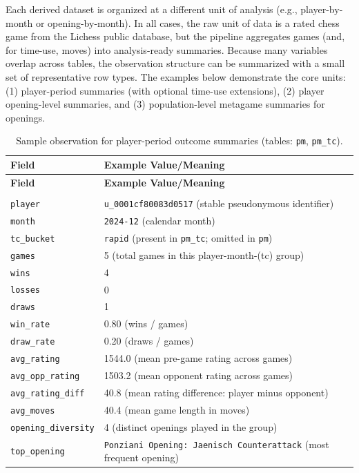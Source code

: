 \documentclass[
  12pt]{article}
\newcommand{\us}{\_\allowbreak}
\begin{document}
Each derived dataset is organized at a different unit of analysis (e.g.,
player-by-month or opening-by-month). In all cases, the raw unit of data
is a rated chess game from the Lichess public database, but the pipeline
aggregates games (and, for time-use, moves) into analysis-ready
summaries. Because many variables overlap across tables, the observation
structure can be summarized with a small set of representative row
types. The examples below demonstrate the core units: (1) player-period
summaries (with optional time-use extensions), (2) player opening-level
summaries, and (3) population-level metagame summaries for openings.

\begin{xltabular}{\textwidth}{>{\raggedright\arraybackslash}p{3.4cm} X}
\caption{Sample observation for player-period outcome summaries (tables: \texttt{pm}, \texttt{pm\us tc}).}\label{tab:obs-player-period-outcomes}\\
\toprule
\textbf{Field} & \textbf{Example Value/Meaning} \\
\midrule
\endfirsthead

\toprule
\textbf{Field} & \textbf{Example Value/Meaning} \\
\midrule
\endhead

\midrule
{} \\
\endfoot

\bottomrule
\endlastfoot

\texttt{player} & \texttt{u\us 0001cf80083d0517} (stable pseudonymous identifier) \\
\texttt{month} & \texttt{2024-12} (calendar month) \\
\texttt{tc\us bucket} & \texttt{rapid} (present in \texttt{pm\us tc}; omitted in \texttt{pm}) \\
\texttt{games} & 5 (total games in this player-month-(tc) group) \\
\texttt{wins} & 4 \\
\texttt{losses} & 0 \\
\texttt{draws} & 1 \\
\texttt{win\us rate} & 0.80 (wins / games) \\
\texttt{draw\us rate} & 0.20 (draws / games) \\
\texttt{avg\us rating} & 1544.0 (mean pre-game rating across games) \\
\texttt{avg\us opp\us rating} & 1503.2 (mean opponent rating across games) \\
\texttt{avg\us rating\us diff} & 40.8 (mean rating difference: player minus opponent) \\
\texttt{avg\us moves} & 40.4 (mean game length in moves) \\
\texttt{opening\us diversity} & 4 (distinct openings played in the group) \\
\texttt{top\us opening} & \texttt{Ponziani Opening: Jaenisch Counterattack} (most frequent opening) \\
\end{xltabular}
\end{document}
